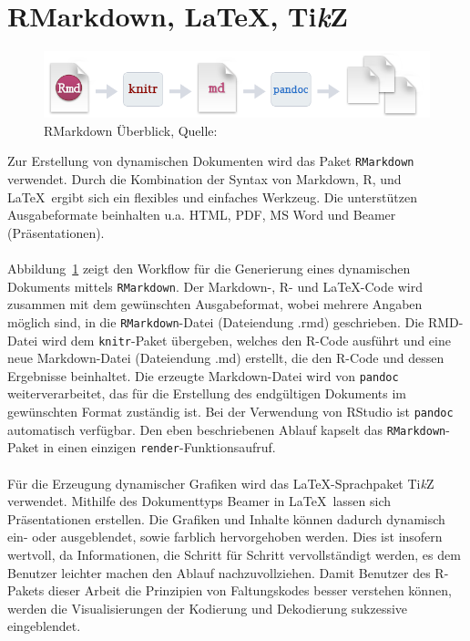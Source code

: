\section{RMarkdown, \LaTeX, Ti\textit{k}Z}
\label{kapitel:rmarkdown}
\begin{figure}[t]
\centering
\includegraphics[width=\ScaleIfNeeded]{abbildungen/rmarkdown}
\caption[RMarkdown Überblick]{RMarkdown Überblick, Quelle: \cite{rmarkdown}}
\label{abb:rmarkdown}
\end{figure}
Zur Erstellung von dynamischen Dokumenten wird das Paket \texttt{RMarkdown} verwendet. Durch die Kombination der Syntax von Markdown, R, und \LaTeX\ ergibt sich ein flexibles und einfaches Werkzeug. Die unterstützen Ausgabeformate beinhalten u.a. HTML, PDF, MS Word und Beamer (Präsentationen).
\\
\\
Abbildung~\ref{abb:rmarkdown} zeigt den Workflow für die Generierung eines dynamischen Dokuments mittels \texttt{RMarkdown}. Der Markdown-, R- und \LaTeX -Code wird zusammen mit dem gewünschten Ausgabeformat, wobei mehrere Angaben möglich sind, in die \texttt{RMarkdown}-Datei (Dateiendung .rmd) geschrieben. Die RMD-Datei wird dem \texttt{knitr}-Paket übergeben, welches den R-Code ausführt und eine neue Markdown-Datei (Dateiendung .md) erstellt, die den R-Code und dessen Ergebnisse beinhaltet. Die erzeugte Markdown-Datei wird von \texttt{pandoc} weiterverarbeitet, das für die Erstellung des endgültigen Dokuments im gewünschten Format zuständig ist. Bei der Verwendung von RStudio ist \texttt{pandoc} automatisch verfügbar. Den eben beschriebenen Ablauf kapselt das \texttt{RMarkdown}-Paket in einen einzigen \texttt{render}-Funktionsaufruf.
\\
\\
Für die Erzeugung dynamischer Grafiken wird das \LaTeX -Sprachpaket Ti\textit{k}Z verwendet. Mithilfe des Dokumenttyps Beamer in \LaTeX\ lassen sich Präsentationen erstellen. Die Grafiken und Inhalte können dadurch dynamisch ein- oder ausgeblendet, sowie farblich hervorgehoben werden. Dies ist insofern wertvoll, da Informationen, die Schritt für Schritt vervollständigt werden, es dem Benutzer leichter machen den Ablauf nachzuvollziehen. Damit Benutzer des R-Pakets dieser Arbeit die Prinzipien von Faltungskodes besser verstehen können, werden die Visualisierungen der Kodierung und Dekodierung sukzessive eingeblendet.